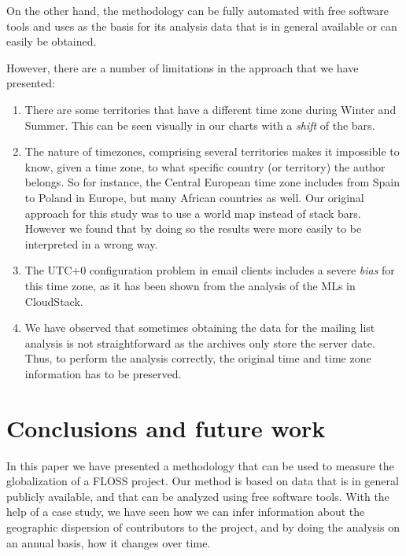 \documentclass{sig-alternate-05-2015}
\begin{document}
On the other hand, the methodology can be fully automated with free software
tools and uses as the
basis for its analysis data that is in general available or can easily be
obtained.

However, there are a number of limitations in the approach that we have
presented:

\begin{enumerate}

  \item There are some territories that have a different time zone during
Winter and Summer. This can be seen visually in our charts with a \emph{shift}
of the bars.

  \item The nature of timezones, comprising several territories makes it
impossible to know, given a time zone, to what specific country (or territory)
the author belongs. So for instance, the Central European time zone includes
from Spain to Poland in Europe, but many African countries as well. Our
original approach for this study was to use a world map instead of stack bars.
However we found that by doing so the results were more easily to be interpreted
in a wrong way.

  \item The UTC+0 configuration problem in email clients includes a severe 
\emph{bias} for this time zone, as it has been shown from the analysis of the
MLs in CloudStack.

  \item We have observed that sometimes obtaining the data for the mailing
list analysis is not straightforward as the archives only store the server
date. Thus, to perform the analysis correctly, the original time and time zone
information has to be preserved.

\end{enumerate}

\section{Conclusions and future work}
\label{sec:conclusions}

In this paper we have presented a methodology that can be used to measure
the globalization of a FLOSS project. Our method is based on data that
is in general publicly available, and that can be analyzed using free software
tools. With the help of a case study, we have seen how we can infer 
information about the geographic dispersion of contributors to the project,
and by doing the analysis on an annual basis, how it changes over time.
\end{document}
